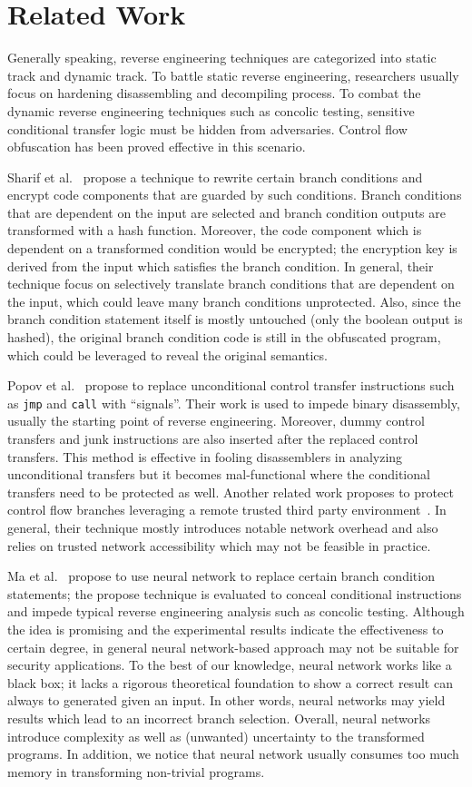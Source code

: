\chapter{Related Work}
Generally speaking, reverse engineering techniques are categorized into static
track and dynamic track. To battle static reverse engineering, researchers
usually focus on hardening disassembling and decompiling process. To combat the
dynamic reverse engineering techniques such as concolic testing, sensitive
conditional transfer logic must be hidden from adversaries. Control flow
obfuscation has been proved effective in this scenario.

Sharif et al.~\cite{Sharif} propose a technique to rewrite certain branch
conditions and encrypt code components that are guarded by such conditions.
Branch conditions that are dependent on the input are selected and branch
condition outputs are transformed with a hash function. Moreover, the code
component which is dependent on a transformed condition would be encrypted; the
encryption key is derived from the input which satisfies the branch condition.
In general, their technique focus on selectively translate branch conditions
that are dependent on the input, which could leave many branch conditions
unprotected. Also, since the branch condition statement itself is mostly
untouched (only the boolean output is hashed), the original branch condition
code is still in the obfuscated program, which could be leveraged to reveal the
original semantics.

Popov et al.~\cite{Popov} propose to replace unconditional control transfer
instructions such as \texttt{jmp} and \texttt{call} with ``signals''. Their work
is used to impede binary disassembly, usually the starting point of reverse
engineering. Moreover, dummy control transfers and junk instructions are also
inserted after the replaced control transfers. This method is effective in
fooling disassemblers in analyzing unconditional transfers but it becomes
mal-functional where the conditional transfers need to be protected as well.
Another related work proposes to protect control flow branches leveraging a
remote trusted third party environment~\cite{Zhi}. In general, their technique
mostly introduces notable network overhead and also relies on trusted network
accessibility which may not be feasible in practice.

Ma et al.~\cite{Ma, Maieee} propose to use neural network to replace certain
branch condition statements; the propose technique is evaluated to conceal
conditional instructions and impede typical reverse engineering analysis such as
concolic testing. Although the idea is promising and the experimental results
indicate the effectiveness to certain degree, in general neural network-based
approach may not be suitable for security applications. To the best of our
knowledge, neural network works like a black box; it lacks a rigorous
theoretical foundation to show a correct result can always to generated given an
input. In other words, neural networks may yield results which lead to an
incorrect branch selection. Overall, neural networks introduce complexity as
well as (unwanted) uncertainty to the transformed programs. In addition, we
notice that neural network usually consumes too much memory in transforming
non-trivial programs.
